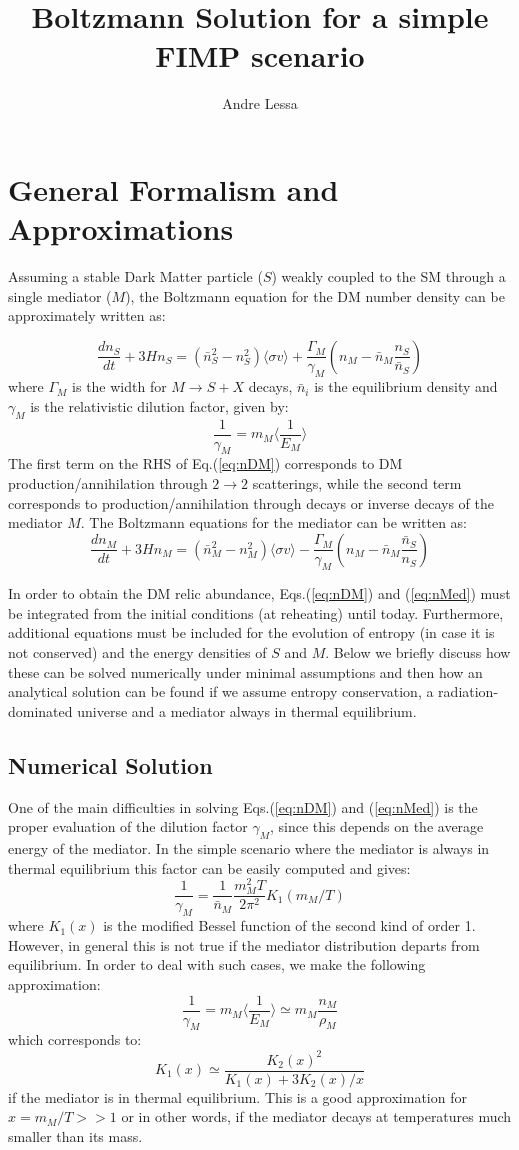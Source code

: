\documentclass{article}
\title{Boltzmann Solution for a simple FIMP scenario}
\author{Andre Lessa}
\def\to{\rightarrow}
\def\be{\begin{equation}}
\def\ee{\end{equation}}
\def\to{\rightarrow}
\newcommand\Drv[2]{\frac{d #1}{d #2}}
\begin{document}
\section{General Formalism and Approximations}

Assuming a stable Dark Matter particle ($S$) weakly coupled to the SM through a single mediator ($M$),
the Boltzmann equation for the DM number density can be approximately written as:

\be
\Drv{n_{S}}{t} + 3H n_S  =  \left( \bar{n}_S^2 - n_S^2 \right) \langle \sigma v \rangle 
+  \frac{\Gamma_M}{\gamma_M} \left(n_M - \bar{n}_M \frac{n_S}{\bar{n}_S} \right)  \label{eq:nDM}
\ee
where $\Gamma_M $ is the width for $M \to S + X$ decays, $\bar{n}_i$ is the equilibrium density and $\gamma_M$ is
the relativistic dilution factor, given by:
\be
\frac{1}{\gamma_M} = m_M \langle \frac{1}{E_M} \rangle \label{eq:gamma}
\ee
The first term on the RHS of Eq.(\ref{eq:nDM}) corresponds to DM production/annihilation through $2 \to 2$ scatterings, while the second term corresponds
to production/annihilation through decays or inverse decays of the mediator $M$.
The Boltzmann equations for the mediator can be written as:
\be
\Drv{n_{M}}{t} + 3H n_M  =  \left( \bar{n}_M^2 - n_M^2 \right) \langle \sigma v \rangle 
- \frac{\Gamma_M}{\gamma_M} \left(n_M - \bar{n}_M \frac{\bar{n}_S}{n_S} \right) \label{eq:nMed}
\ee


In order to obtain the DM relic abundance, Eqs.(\ref{eq:nDM}) and (\ref{eq:nMed}) must be integrated
from the initial conditions (at reheating) until today. Furthermore, additional equations
must be included for the evolution of entropy (in case it is not conserved) and the
energy densities of $S$ and $M$. Below we briefly discuss how these can be solved numerically
under minimal assumptions and then how an analytical solution can be found if we assume entropy conservation,
a radiation-dominated universe and a mediator always in thermal equilibrium.

\subsection{Numerical Solution} \label{sec:num}

One of the main difficulties in solving Eqs.(\ref{eq:nDM}) and (\ref{eq:nMed}) is the proper evaluation
of the dilution factor $\gamma_M$, since this depends on the average energy of the mediator.
In the simple scenario where the mediator is always in thermal equilibrium this factor can be easily
computed and gives:
\be
\frac{1}{\gamma_M} = \frac{1}{\bar{n}_M} \frac{m_M^2 T}{2\pi^2} K_1\left(m_M/T\right) \label{eq:gamma}
\ee
where $K_1(x)$ is the modified Bessel function of the second kind of order 1.
However, in general this is not true if the mediator distribution departs from equilibrium.
In order to deal with such cases, we make the following approximation:
\be
\frac{1}{\gamma_M} = m_M \langle \frac{1}{E_M} \rangle \simeq  m_M \frac{n_M}{\rho_M}
\ee
which corresponds to:
\be
K_1(x) \simeq \frac{K_2(x)^2}{K_1(x) + 3 K_2(x)/x}
\ee
if the mediator is in thermal equilibrium. This is a good approximation for $x = m_M/T >> 1$
or in other words, if the mediator decays at temperatures much smaller than its mass.
\end{document}

